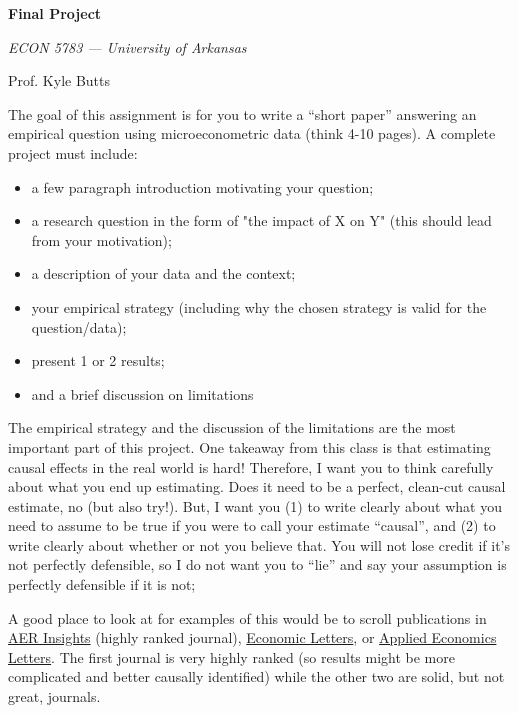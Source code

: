 \documentclass[12pt]{article}
\begin{document}
\begin{center}
  {\Huge\bf Final Project}
  
  \smallskip
  {\large\it  ECON 5783 — University of Arkansas}

  \medskip
  {\large Prof. Kyle Butts}
\end{center}

The goal of this assignment is for you to write a ``short paper'' answering an empirical question using microeconometric data (think 4-10 pages). 
A complete project must include:
\begin{itemize}
  \item a few paragraph introduction motivating your question; 
  \item a research question in the form of "the impact of X on Y" (this should lead from your motivation); 
  \item a description of your data and the context; 
  \item your empirical strategy (including why the chosen strategy is valid for the question/data);
  \item present 1 or 2 results;
  \item and a brief discussion on limitations
\end{itemize}

The empirical strategy and the discussion of the limitations are the most important part of this project. 
One takeaway from this class is that estimating causal effects in the real world is hard! 
Therefore, I want you to think carefully about what you end up estimating. 
Does it need to be a perfect, clean-cut causal estimate, no (but also try!). 
But, I want you (1) to write clearly about what you need to assume to be true if you were to call your estimate ``causal'', and (2) to write clearly about whether or not you believe that. 
You will not lose credit if it's not perfectly defensible, so I do not want you to ``lie'' and say your assumption is perfectly defensible if it is not; 

A good place to look at for examples of this would be to scroll publications in \href{https://www.aeaweb.org/journals/aeri}{AER Insights} (highly ranked journal), \href{https://www.sciencedirect.com/journal/economics-letters}{Economic Letters}, or \href{https://www.tandfonline.com/journals/rael20}{Applied Economics Letters}. 
The first journal is very highly ranked (so results might be more complicated and better causally identified) while the other two are solid, but not great, journals. 
\end{document}
